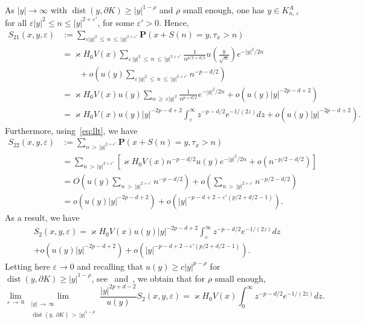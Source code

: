 \documentclass[10pt]{amsart}
\theoremstyle{definition}\newtheorem{defi}[theo]{Definition}\newtheorem{rema}[theo]{Remark}\newtheorem{exam}[theo]{Example}\newtheorem{exem}[theo]{Example}\newtheorem{nota}[theo]{Notation}
\DeclareMathOperator{\dist}{dist}
\newcommand{\pr}{\mathbf{P}}
\renewcommand{\epsilon}{\varepsilon}
\renewcommand{\ge}{\geqslant}
\renewcommand{\leq}{\leqslant}
\renewcommand{\geq}{\geqslant}
\begin{document}
As $| y|\to\infty$ with $\dist(y,\partial K)\geq | y|^{1-\rho}$ and $\rho$ small enough, one has $y\in K_{n,\,\epsilon}^{A}$ for all $\epsilon| y|^{2}\leq n\leq | y|^{2+\epsilon'}$, for some $\epsilon'>0$. Hence,
\begin{align*}
S_{21}(x,y,\varepsilon) &:=\sum_{\varepsilon| y|^2\,\leq\,n\,\leq\,| y|^{2+\epsilon'}}\pr\left(x+S(n)=y,\tau_x>n\right)\\
&=\varkappa H_0 V(x)\sum_{\varepsilon\,| y|^2\,\leq\,n\,\leq\,| y|^{2+\epsilon'}}\frac{1}{n^{p/2+d/2}} u\left(\frac{y}{\sqrt{n}}\right)e^{-| y|^2/2n}\\
&\quad\quad+o\left(u(y)\sum_{\varepsilon\,| y|^2\,\leq\,n\,\leq\,| y|^{2+\epsilon'}}n^{-p-d/2}\right)\\
&=\varkappa H_0 V(x)u(y)\sum_{n\,\ge\,\varepsilon| y|^2}\frac{1}{n^{p+d/2}}e^{-| y|^2/2n} +o\left(u(y)|y|^{-2p-d+2}\right)\\
&=\varkappa H_0 V(x)u(y)| y|^{-2p-d+2}\int_\varepsilon^\infty z^{-p-d/2}e^{-1/(2z)}dz +o\left(u(y)|y|^{-2p-d+2}\right).
\end{align*}
Furthermore, using~\eqref{eq:llt}, we have
\begin{align*}
S_{22}\left(x,y,\varepsilon\right) &:=\sum_{n\,>\, | y|^{2+\epsilon'}}\pr\left(x+S(n)=y,\tau_x>n\right)\\
&= \sum_{n\,>\,| y|^{2+\epsilon'}}\left[\varkappa H_0 V(x)n^{-p-d/2}u\left(y\right)e^{-| y|^2/2n}+o\left(n^{-p/2-d/2}\right)\right]\\
&= O\left(u(y)\sum_{n\,>\,| y|^{2+\epsilon'}}n^{-p-d/2}\right) +o\left(\sum_{n\,>\,| y|^{2+\epsilon'}}n^{-p/2-d/2}\right)\\
&=o\left(u(y)|y|^{-2p-d+2}\right) +o\left(| y|^{-p-d+2-\epsilon'(p/2+d/2-1)}\right).
\end{align*}
As a result, we have
\begin{multline*}
S_{2}(x,y,\varepsilon) =\varkappa H_0 V(x)u(y)| y|^{-2p-d+2}\int_\varepsilon^\infty z^{-p-d/2}e^{-1/(2z)}dz\\
+o\left(u(y)|y|^{-2p-d+2}\right) +o\left(| y|^{-p-d+2-\epsilon'(p/2+d/2-1)}\right).
\end{multline*}
Letting here $\varepsilon\to0$ and recalling that $u(y)\ge c| y|^{p-\rho}$ for $\dist(y,\partial K)\ge | y|^{1-\rho}$, see~\cite[Lemma~19]{DeWa-15} and~\cite{Va-99}, we obtain that for $\rho$ small enough,
\begin{equation}\label{lim_S_2_b}
\lim_{\varepsilon\,\to\,0}\lim_{\substack{| y|\,\to\,\infty\\ \dist(y,\,\partial K)\,>\,| y|^{1-\rho}}}\frac{| y|^{2p+d-2}}{u(y)}S_2\left(x,y,\varepsilon\right) =\varkappa H_0 V(x)\int_0^\infty z^{-p-d/2}e^{-1/(2z)}dz.
\end{equation}
\end{document}
